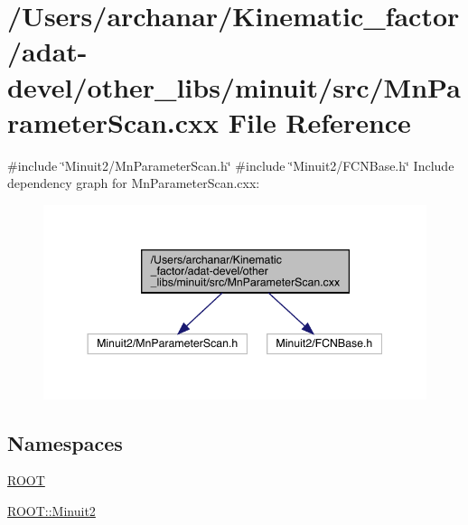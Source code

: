 \hypertarget{adat-devel_2other__libs_2minuit_2src_2MnParameterScan_8cxx}{}\section{/\+Users/archanar/\+Kinematic\+\_\+factor/adat-\/devel/other\+\_\+libs/minuit/src/\+Mn\+Parameter\+Scan.cxx File Reference}
\label{adat-devel_2other__libs_2minuit_2src_2MnParameterScan_8cxx}
{\ttfamily \#include \char`\"{}Minuit2/\+Mn\+Parameter\+Scan.\+h\char`\"{}}\newline
{\ttfamily \#include \char`\"{}Minuit2/\+F\+C\+N\+Base.\+h\char`\"{}}\newline
Include dependency graph for Mn\+Parameter\+Scan.\+cxx\+:
\nopagebreak
\begin{figure}[H]
\begin{center}
\leavevmode
\includegraphics[width=344pt]{d1/d49/adat-devel_2other__libs_2minuit_2src_2MnParameterScan_8cxx__incl}
\end{center}
\end{figure}
\subsection*{Namespaces}
\begin{DoxyCompactItemize}
\item 
 \mbox{\hyperlink{namespaceROOT}{R\+O\+OT}}
\item 
 \mbox{\hyperlink{namespaceROOT_1_1Minuit2}{R\+O\+O\+T\+::\+Minuit2}}
\end{DoxyCompactItemize}
